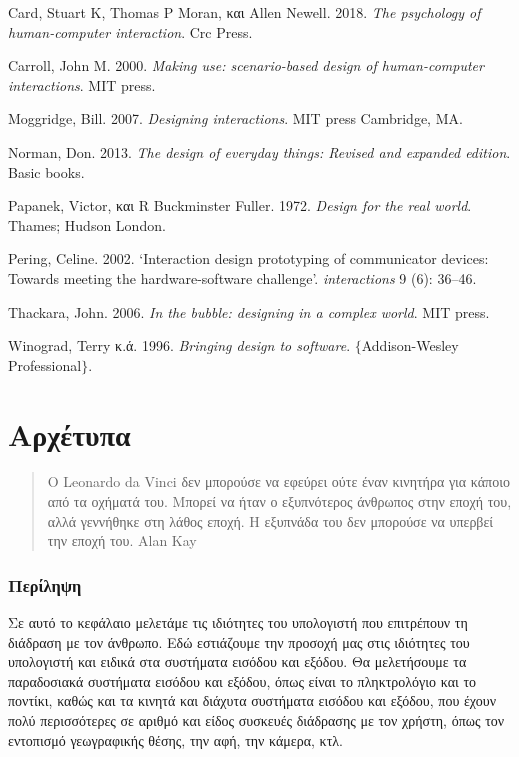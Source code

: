 \documentclass[
]{article}
\begin{document}
Card, Stuart K, Thomas P Moran, και Allen Newell. 2018. \emph{The
psychology of human-computer interaction}. Crc Press.

Carroll, John M. 2000. \emph{Making use: scenario-based design of
human-computer interactions}. MIT press.

Moggridge, Bill. 2007. \emph{Designing interactions}. MIT press
Cambridge, MA.

Norman, Don. 2013. \emph{The design of everyday things: Revised and
expanded edition}. Basic books.

Papanek, Victor, και R Buckminster Fuller. 1972. \emph{Design for the
real world}. Thames; Hudson London.

Pering, Celine. 2002. {`Interaction design prototyping of communicator
devices: Towards meeting the hardware-software challenge'}.
\emph{interactions} 9 (6): 36--46.

Thackara, John. 2006. \emph{In the bubble: designing in a complex
world}. MIT press.

Winograd, Terry κ.ά. 1996. \emph{Bringing design to software}.
\(\{\)Addison-Wesley Professional\(\}\).

\hypertarget{ux3b1ux3c1ux3c7ux3adux3c4ux3c5ux3c0ux3b1}{%
\section{Αρχέτυπα}\label{ux3b1ux3c1ux3c7ux3adux3c4ux3c5ux3c0ux3b1}}

\begin{quote}
O Leonardo da Vinci δεν μπορούσε να εφεύρει ούτε έναν κινητήρα για
κάποιο από τα οχήματά του. Μπορεί να ήταν ο εξυπνότερος άνθρωπος στην
εποχή του, αλλά γεννήθηκε στη λάθος εποχή. Η εξυπνάδα του δεν μπορούσε
να υπερβεί την εποχή του. Alan Kay
\end{quote}

\hypertarget{ux3c0ux3b5ux3c1ux3afux3bbux3b7ux3c8ux3b7}{%
\subsubsection{Περίληψη}\label{ux3c0ux3b5ux3c1ux3afux3bbux3b7ux3c8ux3b7}}

Σε αυτό το κεφάλαιο μελετάμε τις ιδιότητες του υπολογιστή που επιτρέπουν
τη διάδραση με τον άνθρωπο. Εδώ εστιάζουμε την προσοχή μας στις
ιδιότητες του υπολογιστή και ειδικά στα συστήματα εισόδου και εξόδου. Θα
μελετήσουμε τα παραδοσιακά συστήματα εισόδου και εξόδου, όπως είναι το
πληκτρολόγιο και το ποντίκι, καθώς και τα κινητά και διάχυτα συστήματα
εισόδου και εξόδου, που έχουν πολύ περισσότερες σε αριθμό και είδος
συσκευές διάδρασης με τον χρήστη, όπως τον εντοπισμό γεωγραφικής θέσης,
την αφή, την κάμερα, κτλ.
\end{document}
